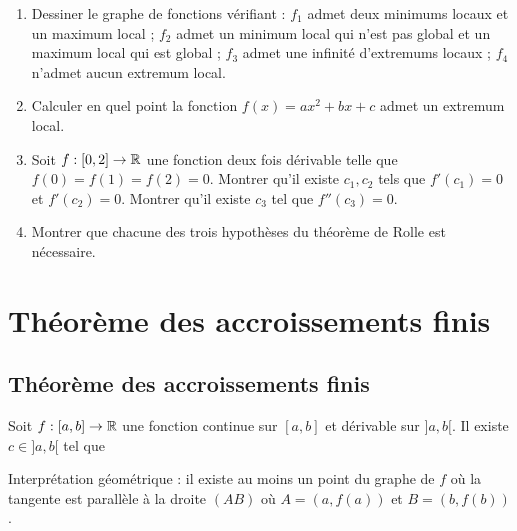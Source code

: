 \documentclass[class=report,crop=false]{standalone}
\begin{document}

\begin{miniexercices}
\sauteligne
\begin{enumerate}
  \item Dessiner le graphe de fonctions vérifiant :  $f_1$ admet deux minimums locaux et un maximum local ;
$f_2$ admet un minimum local qui n'est pas global et un maximum local qui est global ;
$f_3$ admet une infinité d'extremums locaux ; $f_4$ n'admet aucun extremum local.
  \item Calculer en quel point la fonction $f(x)=ax^2+bx+c$ admet un extremum local.
  \item Soit $f : [0,2] \to \mathbb{R}$ une fonction deux fois dérivable telle que $f(0)=f(1)=f(2)=0$.
Montrer qu'il existe $c_1,c_2$ tels que $f'(c_1)=0$ et $f'(c_2)=0$. Montrer qu'il existe
$c_3$ tel que $f''(c_3)=0$.
  \item Montrer que chacune des trois hypothèses du théorème de Rolle est nécessaire.
\end{enumerate}
\end{miniexercices}


\section{Théorème des accroissements finis}

\subsection{Théorème des accroissements finis}


\begin{theoreme}
Soit $f:[a,b] \to \mathbb{R}$ une fonction continue sur $[a,b]$ et dérivable sur $]a,b[$.
Il existe $c\in]a,b[$ tel que
\end{theoreme}


Interprétation géométrique : il existe au moins un point du graphe de $f$ où la tangente est
parallèle à la droite $(AB)$ où $A=(a,f(a))$ et $B=(b,f(b))$.
\end{document}
